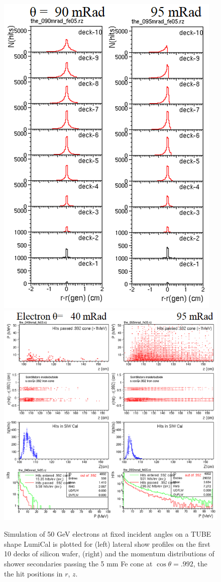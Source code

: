 \begin{figure}[bh!] 
	\centering
	\includegraphics[width=.30\linewidth]{Figures/MDI/TUBE_lateral.png}   
	\hspace{.5cm}
	\includegraphics[width=.45\linewidth]{Figures/MDI/TUBE_lateral_p.png} 
	\vspace{-.2cm}
	\caption{ Simulation of 50 GeV electrons at fixed incident angles 
		on a TUBE shape LumiCal is plotted for 
		(left) lateral show profiles on the first 10 decks of silicon wafer,
		(right) and the momentum distributions of shower secondaries passing
		the 5 mm Fe cone at $\cos\theta=.992$, the the hit positions in $r$, $z$.
		\label{fig:TUBE_leak} }
	

\end{figure}
